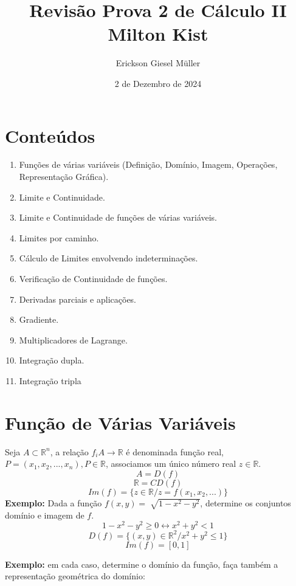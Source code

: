 \documentclass{article}
\title{Revisão Prova 2 de Cálculo II\\Milton Kist}
\author{Erickson Giesel Müller}
\date{2 de Dezembro de 2024}
\begin{document}
	\maketitle
	
	\section*{Conteúdos}
		\begin{enumerate}
			\item Funções de várias variáveis (Definição, Domínio, Imagem, Operações, Representação Gráfica).
			\item Limite e Continuidade.
			\item Limite e Continuidade de funções de várias variáveis.
			\item Limites por caminho.
			\item Cálculo de Limites envolvendo indeterminações.
			\item Verificação de Continuidade de funções.
			\item Derivadas parciais e aplicações.
			\item Gradiente.
			\item Multiplicadores de Lagrange.
			\item Integração dupla.
			\item Integração tripla
			
		\end{enumerate}
	\newpage
	
	\section{Função de Várias Variáveis}
		Seja $A\subset \mathbb{R}^n$, a relação $f_i A \to \mathbb{R}$ é denominada função real, $P=(x_1,x_2,...,x_n), P\in \mathbb{R}$, associamos um único número real $z \in \mathbb{R}$.
		$$A=D(f)$$
		$$\mathbb{R}=CD(f)$$
		$$Im(f)=\{z \in \mathbb{R}/z=f(x_1,x_2,...)\}$$
		\textbf{Exemplo:} Dada a função $f(x,y)=\sqrt[]{1-x^2-y^2}$, determine os conjuntos domínio e imagem de $f$.
		$$1-x^2-y^2 \geq 0 \leftrightarrow x^2+y^2 < 1$$
		$$D(f) = \{(x,y) \in \mathbb{R}^2/x^2+y^2\leq 1\}$$
		$$Im(f)=[0,1]$$
		
		\textbf{Exemplo:} em cada caso, determine o domínio da função, faça também a representação geométrica do domínio:
	
\end{document}
